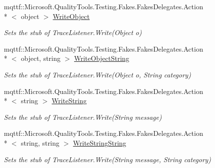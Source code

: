 \begin{DoxyCompactItemize}
mqttf\-::\-Microsoft.\-Quality\-Tools.\-Testing.\-Fakes.\-Fakes\-Delegates.\-Action\\*
$<$ object $>$ \hyperlink{class_system_1_1_diagnostics_1_1_fakes_1_1_stub_trace_listener_a26c9032a5306196712b156784ad517c3}{Write\-Object}
\begin{DoxyCompactList}\small\item\em Sets the stub of Trace\-Listener.\-Write(\-Object o)\end{DoxyCompactList}\item 
mqttf\-::\-Microsoft.\-Quality\-Tools.\-Testing.\-Fakes.\-Fakes\-Delegates.\-Action\\*
$<$ object, string $>$ \hyperlink{class_system_1_1_diagnostics_1_1_fakes_1_1_stub_trace_listener_a356829e8bc8d8ee940efcd856076ee77}{Write\-Object\-String}
\begin{DoxyCompactList}\small\item\em Sets the stub of Trace\-Listener.\-Write(\-Object o, String category)\end{DoxyCompactList}\item 
mqttf\-::\-Microsoft.\-Quality\-Tools.\-Testing.\-Fakes.\-Fakes\-Delegates.\-Action\\*
$<$ string $>$ \hyperlink{class_system_1_1_diagnostics_1_1_fakes_1_1_stub_trace_listener_ab323e53e683804828e0b9470aa912434}{Write\-String}
\begin{DoxyCompactList}\small\item\em Sets the stub of Trace\-Listener.\-Write(\-String message)\end{DoxyCompactList}\item 
mqttf\-::\-Microsoft.\-Quality\-Tools.\-Testing.\-Fakes.\-Fakes\-Delegates.\-Action\\*
$<$ string, string $>$ \hyperlink{class_system_1_1_diagnostics_1_1_fakes_1_1_stub_trace_listener_a6c5536f834a7a07f1c626bc366e0c4e0}{Write\-String\-String}
\begin{DoxyCompactList}\small\item\em Sets the stub of Trace\-Listener.\-Write(\-String message, String category)\end{DoxyCompactList}\end{DoxyCompactItemize}
